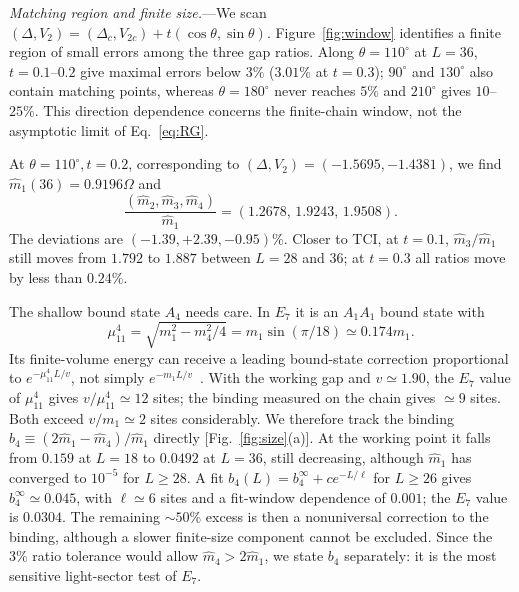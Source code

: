 \documentclass[aps,prl,twocolumn,superscriptaddress,showpacs,floatfix,10pt]{revtex4-2}
\begin{document}
\emph{Matching region and finite size.}---We scan
$(\Delta,V_2)=(\Delta_c,V_{2c})+t(\cos\theta,\sin\theta)$.
Figure~\ref{fig:window} identifies a finite region of small errors among the
three gap ratios. Along $\theta=110^\circ$ at $L=36$, $t=0.1$--$0.2$ give maximal errors below
$3\%$ ($3.01\%$ at $t=0.3$); $90^\circ$ and $130^\circ$ also contain matching
points, whereas $\theta=180^\circ$ never reaches $5\%$ and $210^\circ$ gives
$10$--$25\%$. This direction dependence concerns the finite-chain window, not the
asymptotic limit of Eq.~\eqref{eq:RG}.

At $\theta=110^\circ,t=0.2$, corresponding to
$(\Delta,V_2)=(-1.5695,-1.4381)$, we find
$\widehat m_1(36)=0.9196\Omega$ and
\begin{equation}
 \frac{(\widehat m_2,\widehat m_3,\widehat m_4)}{\widehat m_1}
 =(1.2678,\,1.9243,\,1.9508).
 \label{eq:point}
\end{equation}
The deviations are $(-1.39,+2.39,-0.95)\%$. Closer to TCI, at $t=0.1$,
$\widehat m_3/\widehat m_1$ still moves from $1.792$ to $1.887$ between $L=28$
and $36$; at $t=0.3$ all ratios move by less than $0.24\%$.

The shallow bound state $A_4$ needs care. In $E_7$ it is an $A_1A_1$ bound state with
\begin{equation}
 \mu_{11}^{4}=\sqrt{m_1^2-m_4^2/4}
             =m_1\sin(\pi/18)\simeq0.174m_1.
 \label{eq:mu}
\end{equation}
Its finite-volume energy can receive a leading bound-state correction
proportional to $e^{-\mu_{11}^{4}L/v}$, not simply
$e^{-m_1L/v}$~\cite{Pozsgay2008,CortesCubero2022}.
With the working gap and $v\simeq1.90$, the $E_7$ value of $\mu_{11}^4$ gives
$v/\mu_{11}^{4}\simeq12$ sites; the binding measured on the chain gives
$\simeq9$ sites. Both exceed $v/m_1\simeq2$ sites considerably.
We therefore track the binding $b_4\equiv(2\widehat m_1-\widehat m_4)/\widehat m_1$
directly [Fig.~\ref{fig:size}(a)]. At the working point it falls from $0.159$ at
$L=18$ to $0.0492$ at $L=36$, still decreasing, although $\widehat m_1$ has
converged to $10^{-5}$ for $L\ge28$. A fit $b_4(L)=b_4^\infty+ce^{-L/\ell}$ for $L\ge26$ gives
$b_4^\infty\simeq0.045$, with $\ell\simeq6$ sites and a fit-window dependence
of $0.001$; the $E_7$ value is $0.0304$. The remaining $\sim50\%$ excess is then
a nonuniversal correction to the binding, although a slower finite-size component
cannot be excluded. Since the $3\%$ ratio tolerance would allow $\widehat m_4>2\widehat m_1$,
we state $b_4$ separately: it is the most sensitive light-sector test of $E_7$.
\end{document}
